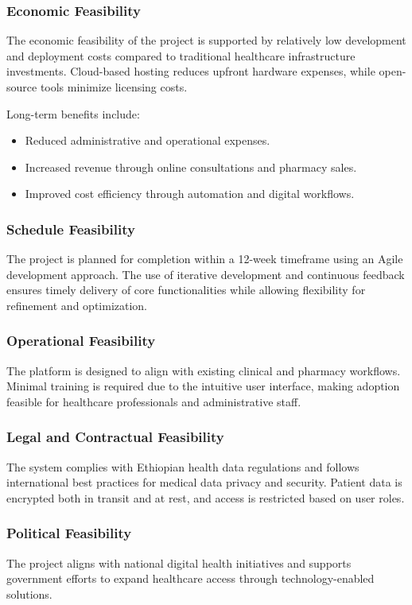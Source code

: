 \documentclass[12pt,a4paper]{report}
\begin{document}
\subsubsection{Economic Feasibility}
The economic feasibility of the project is supported by relatively low development and deployment costs compared to traditional healthcare infrastructure investments. Cloud-based hosting reduces upfront hardware expenses, while open-source tools minimize licensing costs.

Long-term benefits include:
\begin{itemize}
    \item Reduced administrative and operational expenses.
    \item Increased revenue through online consultations and pharmacy sales.
    \item Improved cost efficiency through automation and digital workflows.
\end{itemize}

\subsubsection{Schedule Feasibility}
The project is planned for completion within a 12-week timeframe using an Agile development approach. The use of iterative development and continuous feedback ensures timely delivery of core functionalities while allowing flexibility for refinement and optimization.

\subsubsection{Operational Feasibility}
The platform is designed to align with existing clinical and pharmacy workflows. Minimal training is required due to the intuitive user interface, making adoption feasible for healthcare professionals and administrative staff.

\subsubsection{Legal and Contractual Feasibility}
The system complies with Ethiopian health data regulations and follows international best practices for medical data privacy and security. Patient data is encrypted both in transit and at rest, and access is restricted based on user roles.

\subsubsection{Political Feasibility}
The project aligns with national digital health initiatives and supports government efforts to expand healthcare access through technology-enabled solutions.
\end{document}
